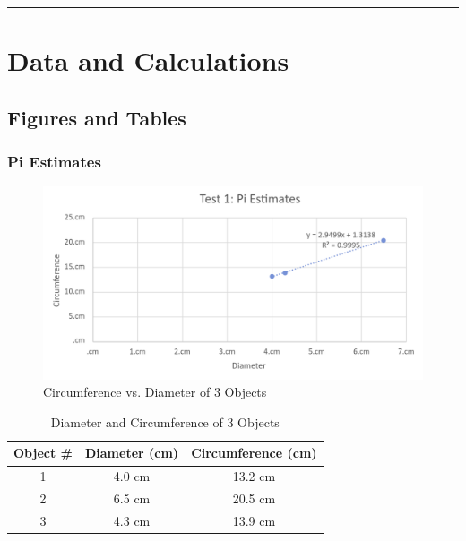 \documentclass{article}
\begin{document}
\vspace{1em}
\hrule
\section{Data and Calculations}

\subsection{Figures and Tables}
\subsubsection{Pi Estimates}
\begin{figure}[H]
    \caption{Circumference vs. Diameter of 3 Objects}
    \label{plot:1}
    \includegraphics[width=16cm]{lab1_plot1.png}
\end{figure}

\setlength{\tabcolsep}{18pt}
\renewcommand{\arraystretch}{1.5}
\begin{table}[H]
\caption{Diameter and Circumference of 3 Objects}\vspace{0.5em}
\label{tab:1}
\centering
\begin{tabular}{|c|c|c|}
    \hline
    \rowcolor{black}
    \color{white} Object \# & \color{white} Diameter (cm) & \color{white} Circumference (cm) \\
    \hline
    1 & 4.0 cm & 13.2 cm \\
    \hline
    2 & 6.5 cm & 20.5 cm \\
    \hline
    3 & 4.3 cm & 13.9 cm \\
    
    \hline
\end{tabular}
\end{table}
\end{document}
